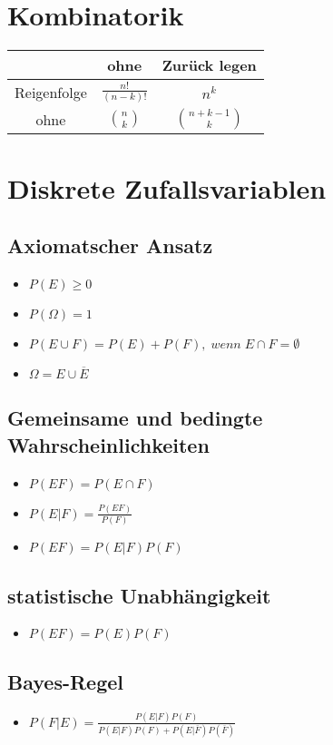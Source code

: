 \documentclass{article}
\begin{document}
\section{Kombinatorik}
\begin{tabular}{c| c |c}
  & ohne & Zurück legen \\ \hline
  Reigenfolge & $\frac{n!}{(n-k)!}$&$n^k$ \\
  ohne&${n \choose k}$ & ${n + k -1 \choose k}$ \\
  
\end{tabular}

\section{Diskrete Zufallsvariablen}
\subsection{Axiomatscher Ansatz}
\begin{itemize}
\item $P(E)\geq 0$
\item $P(\Omega) = 1$
\item $P(E\cup F) = P(E)+P(F), \; wenn\;  E\cap F = \emptyset $
\item $\Omega = E \cup \overline{E}$
\end{itemize}


\subsection{Gemeinsame und bedingte Wahrscheinlichkeiten}
\begin{itemize}
\item$P(EF) = P(E\cap F)$
\item $P(E|F) = \frac{P(EF)}{P(F)}$
\item $P(EF) = P(E|F)P(F)$
\end{itemize}




\subsection{statistische Unabhängigkeit}
\begin{itemize}
\item $P(EF) = P(E) P(F)$
\end{itemize}

\subsection{Bayes-Regel}
\begin{itemize}
\item $P(F|E) = \frac{P(E|F) P(F)}{P(E|F) P(F)+P(E|\overline{F})P(\overline{F})}$
\end{itemize}
\end{document}
